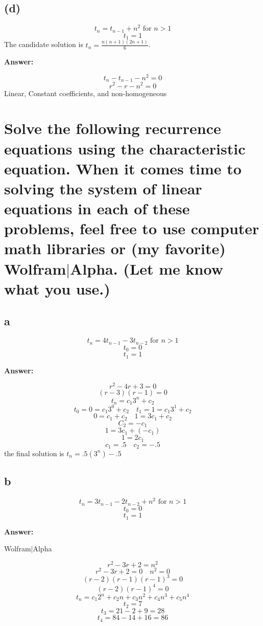 \documentclass[12pt]{report}
\begin{document}
\subsection*{(d)}

$$ t_n = t_{n-1} + n^2 \text{ for } n > 1 $$
$$ t_1 = 1 $$
The candidate solution is $ t_n = \frac{n(n+1)(2n+1)}{6} $.

\textbf{Answer:}

$$ t_n - t_{n-1} - n^2 = 0 $$
$$ r^2 - r - n^2 = 0 $$
Linear, Constant coefficients, and non-homogeneous


\section{Solve the following recurrence equations using the characteristic equation. When it comes time to
solving the system of linear equations in each of these problems, feel free to use computer math libraries
or (my favorite) Wolfram$\vert$Alpha. (Let me know what you use.)}

\subsection*{{a}}

$$ t_n = 4t_{n-1} - 3t_{n-2} \text{ for } n > 1 $$
$$ t_0 = 0 $$
$$ t_1 = 1 $$

\textbf{Answer:}

$$ r^2 - 4r + 3 = 0 $$
$$ (r - 3)(r-1) = 0 $$
$$ t_n = c_1 3^n + c_2 $$
$$ t_0 = 0 = c_1 3^0 + c_2 \quad t_1 = 1 = c_1 3^1 + c_2 $$
$$ 0 = c_1 + c_2 \quad 1 = 3 c_1 + c_2 $$
$$ C_2 = -c_1 $$
$$ 1 = 3 c_1 + (- c_1 ) $$
$$ 1 = 2 c_1 $$
$$ c_1 = .5 \quad c_2 = -.5 $$
the final solution is $ t_n = .5(3^n) - .5$  


\subsection*{{b}}

$$ t_n = 3t_{n-1} - 2t_{n-2} + n^2 \text{ for } n > 1 $$
$$ t_0 = 0 $$
$$ t_1 = 1 $$

\textbf{Answer:}

Wolfram$\vert$Alpha

$$ r^2 - 3r + 2 = n^2 $$
$$ r^2 - 3r + 2 = 0 \quad n^2 = 0 $$
$$ (r-2)(r-1)(r-1)^3 = 0 $$
$$ (r-2)(r-1)^4 = 0 $$
$$ t_n = c_1 2^n + c_2 n + c_3 n^2 + c_4 n^3 + c_5 n^4 $$
$$ t_2 = 7 $$
$$ t_3 = 21 - 2 + 9 = 28 $$
$$ t_4 = 84 - 14 + 16 = 86 $$
\end{document}
